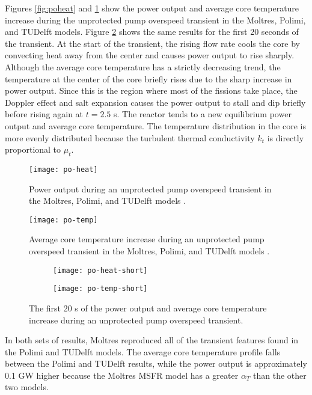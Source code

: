 Figures \ref{fig:poheat} and
\ref{fig:potemp} show the power output and average core temperature increase
during the unprotected pump overspeed transient in the Moltres, Polimi, and
TUDelft models. Figure \ref{fig:poshort} shows the same results for the first
20 seconds of the transient. At the start of the transient, the rising flow
rate cools the core by convecting heat away from the center and causes power
output to rise sharply. Although the
average core temperature has a strictly decreasing trend, the temperature at
the center of the core briefly rises due to the sharp increase in power
output. Since this is the region where most of the fissions take place, the
Doppler effect and salt expansion causes the power output to stall and dip
briefly before rising again at $t=2.5$ s. The reactor tends to a new
equilibrium power output and average core temperature. The temperature
distribution in the core is more evenly distributed because the turbulent
thermal conductivity $k_t$ is directly proportional to $\mu_t$.

\begin{figure}[htbp!]
    \centering
    \texttt{[image: po-heat]}
    \caption{Power output during
    an unprotected pump overspeed transient in the Moltres, Polimi, and
    TUDelft models \cite{fiorina_modelling_2014}.}
    \label{fig:poheat}
    \texttt{[image: po-temp]}
    \caption{Average core temperature increase during
    an unprotected pump overspeed transient in the Moltres, Polimi, and
    TUDelft models \cite{fiorina_modelling_2014}.}
    \label{fig:potemp}
\end{figure}

\begin{figure}[htbp!]
    \centering
    \begin{subfigure}[t]{.485\textwidth}
        \centering
        \texttt{[image: po-heat-short]}
    \end{subfigure}
    \hfill
    \begin{subfigure}[t]{.485\textwidth}
        \centering
        \texttt{[image: po-temp-short]}
    \end{subfigure}
    \caption{The first 20 s of the power output and average core temperature
    increase during an unprotected pump overspeed transient.}
    \label{fig:poshort}
\end{figure}

In both sets of results, Moltres reproduced all of the transient features
found in the Polimi and TUDelft models. The average core temperature profile
falls between the Polimi and TUDelft results, while the power output is
approximately 0.1 GW higher because the Moltres \gls{MSFR} model has a
greater $\alpha_T$ than the other two models. 

